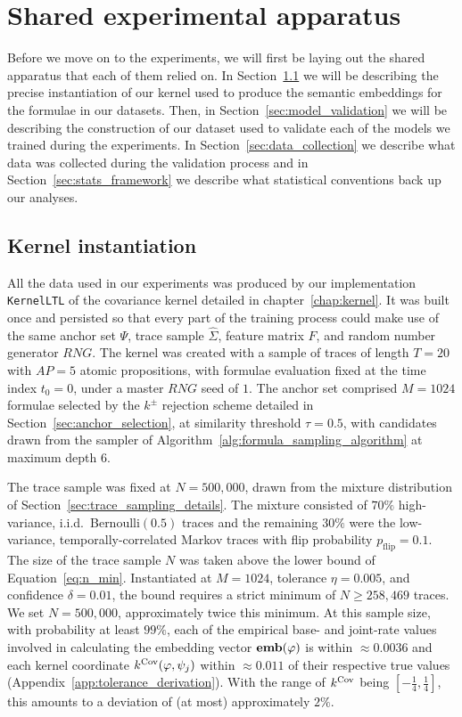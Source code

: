 \documentclass[titlepage,a4paper,11pt]{report}
\begin{document}
    
    \section{Shared experimental apparatus}\label{sec:shared_apparatus}
    Before we move on to the experiments, we will first be laying out the shared apparatus that each of them relied on. In Section~\ref{sec:kernel_instantiation} we will be describing the precise instantiation of our kernel used to produce the semantic embeddings for the formulae in our datasets. Then, in Section~\ref{sec:model_validation} we will be describing the construction of our dataset used to validate each of the models we trained during the experiments. In Section~\ref{sec:data_collection} we describe what data was collected during the validation process and in Section~\ref{sec:stats_framework} we describe what statistical conventions back up our analyses.  
    
    \subsection{Kernel instantiation}\label{sec:kernel_instantiation}
    
    All the data used in our experiments was produced by our implementation \texttt{KernelLTL} of the covariance kernel detailed in chapter~\ref{chap:kernel}. It was built once and persisted so that every part of the training process could make use of the same anchor set $\Psi$, trace sample $\widehat \Sigma$, feature matrix $F$, and random number generator $RNG$. The kernel was created with a sample of traces of length $T = 20$ with $\mathit{AP} = 5$ atomic propositions, with formulae evaluation fixed at the time index $t_0 = 0$, under a master $RNG$ seed of $1$. The anchor set comprised $M = 1024$ formulae selected by the $k^{\pm}$ rejection scheme detailed in Section~\ref{sec:anchor_selection}, at similarity threshold $\tau = 0.5$, with candidates drawn from the sampler of Algorithm~\ref{alg:formula_sampling_algorithm} at maximum depth $6$.
    
    The trace sample was fixed at $N = 500{,}000$, drawn from the mixture distribution of Section~\ref{sec:trace_sampling_details}. The mixture consisted of $70\%$ high-variance, i.i.d.\ Bernoulli$(0.5)$ traces and the remaining $30\%$ were the low-variance, temporally-correlated Markov traces with flip probability $p_{\text{flip}}=0.1$. The size of the trace sample $N$ was taken above the lower bound of Equation~\eqref{eq:n_min}. Instantiated at $M = 1024$, tolerance $\eta = 0.005$, and confidence $\delta = 0.01$, the bound requires a strict minimum of $N \ge 258{,}469$ traces. We set $N = 500{,}000$, approximately twice this minimum. At this sample size, with probability at least $99\%$, each of the empirical base- and joint-rate values involved in calculating the embedding vector $\textbf{emb}(\varphi)$ is within $\approx 0.0036$ and each kernel coordinate $k^{\mathrm{Cov}}(\varphi, \psi_j)$ within $\approx 0.011$ of their respective true values (Appendix~\ref{app:tolerance_derivation}). With the range of $k^{\mathrm{Cov}}$ being $[-\tfrac14, \tfrac14]$, this amounts to a deviation of (at most) approximately $2\%$.
    
\end{document}
